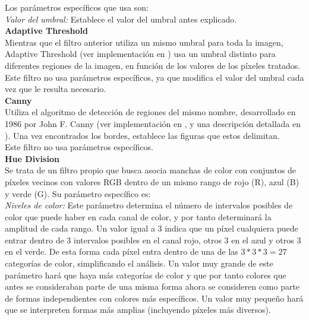 		Los parámetros específicos que usa son:\\		
		
		\noindent\textit{Valor del umbral:} Establece el valor del umbral antes explicado.\\
		
	\noindent\textbf{Adaptive Threshold}\\

		Mientras que el filtro anterior utiliza un mismo umbral para toda la imagen, Adaptive Threshold (ver implementación en \cite{opencvDoc}) usa un umbral distinto para diferentes regiones de la imagen, en función de los valores de los píxeles tratados.\\ 
		
		Este filtro no usa parámetros específicos, ya que modifica el valor del umbral cada vez que le resulta necesario.\\
		
	\noindent\textbf{Canny}\\

		Utiliza el algoritmo de detección de regiones del mismo nombre, desarrollado en 1986 por John F. Canny (ver implementación en \cite{opencvDoc}, y una descripción detallada en \cite{pajares}). Una vez encontrados los bordes, establece las figuras que estos delimitan.\\
		
		Este filtro no usa parámetros específicos.\\
		
	\noindent\textbf{Hue Division}\\


		Se trata de un filtro propio que busca asocia manchas de color con conjuntos de píxeles vecinos con valores RGB dentro de un mismo rango de rojo (R), azul (B) y verde (G). Su parámetro específico es:\\
		
		\noindent\textit{Niveles de color:} Este parámetro determina el número de intervalos posibles de color que puede haber en cada canal de color, y por tanto determinará la amplitud de cada rango. Un valor igual a 3 indica que un píxel cualquiera puede entrar dentro de 3 intervalos posibles en el canal rojo, otros 3 en el azul y otros 3 en el verde. De esta forma cada píxel entra dentro de una de las $3*3*3=27$ categorías de color, simplificando el análisis. Un valor muy grande de este parámetro hará que haya más categorías de color y que por tanto colores que antes se consideraban parte de una misma forma ahora se consideren como parte de formas independientes con colores más específicos. Un valor muy pequeño hará que se interpreten formas más amplias (incluyendo píxeles más diversos).\\
		
